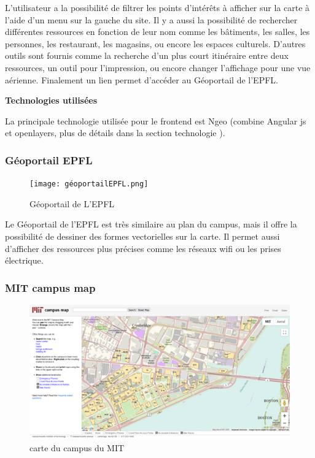\documentclass[
    iai, %
    il, %
]{heig-tb}
\begin{document}
L'utilisateur a la possibilité de filtrer les points d'intérêts à afficher sur la carte à l'aide d'un menu sur la gauche du site.
Il y a aussi la possibilité de rechercher différentes ressources en fonction de leur nom comme les bâtiments, les salles, les personnes, les restaurant, les magasins, ou encore les espaces culturels.
D'autres outils sont fournis comme la recherche d'un plus court itinéraire entre deux ressources, un outil pour l'impression, ou encore changer l'affichage pour une vue aérienne.
Finalement un lien permet d'accéder au Géoportail de l'EPFL.

\textbf{Technologies utilisées}

La principale technologie utilisée pour le frontend est Ngeo (combine Angular js et openlayers, plus de détails dans la section technologie ).

\subsubsection{Géoportail EPFL}

\begin{figure}[h]
    \centering
    \texttt{[image: géoportailEPFL.png]}
    \caption{Géoportail de L'EPFL}
\end{figure}

Le Géoportail de l'EPFL \cite{geoportail-epfl} est très similaire au plan du campus, mais il offre la possibilité de dessiner des formes vectorielles sur la carte.
Il permet aussi d'afficher des ressources plus précises comme les réseaux wifi ou les prises électrique.

\subsubsection{MIT campus map}

\begin{figure}[h]
    \centering
    \includegraphics[scale=0.7]{MitCampusMap.png}
    \caption{carte du campus du MIT}
\end{figure}
\end{document}
